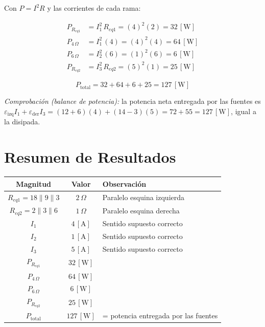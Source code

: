 \documentclass[12pt,letterpaper]{article}
\begin{document}
Con $P = I^2 R$ y las corrientes de cada rama:

\begin{align*}
    P_{R_{eq1}} &= I_1^2\,R_{eq1} = (4)^2 (2) = 32\,[\text{W}] \\
    P_{4\,\Omega} &= I_1^2\,(4) = (4)^2 (4) = 64\,[\text{W}] \\
    P_{6\,\Omega} &= I_2^2\,(6) = (1)^2 (6) = 6\,[\text{W}] \\
    P_{R_{eq2}} &= I_3^2\,R_{eq2} = (5)^2 (1) = 25\,[\text{W}]
\end{align*}

\[
    \boxed{P_{\text{total}} = 32 + 64 + 6 + 25 = 127\,[\text{W}]}
\]

\noindent\small\textit{Comprobaci\'on (balance de potencia):} la potencia neta entregada por las
fuentes es $\varepsilon_{\text{izq}}I_1 + \varepsilon_{\text{der}}I_3 = (12{+}6)(4) + (14{-}3)(5)
= 72 + 55 = 127\,[\text{W}]$, igual a la disipada. \checkmark
\normalsize

\section*{Resumen de Resultados}

\begin{center}
\begin{tabular}{|c|c|l|}
\hline
\textbf{Magnitud} & \textbf{Valor} & \textbf{Observaci\'on} \\
\hline
$R_{eq1} = 18\|9\|3$ & $2\,\Omega$ & Paralelo esquina izquierda \\
$R_{eq2} = 2\|3\|6$  & $1\,\Omega$ & Paralelo esquina derecha \\
\hline
$I_1$ & $4\,[\text{A}]$ & Sentido supuesto correcto \\
$I_2$ & $1\,[\text{A}]$ & Sentido supuesto correcto \\
$I_3$ & $5\,[\text{A}]$ & Sentido supuesto correcto \\
\hline
$P_{R_{eq1}}$ & $32\,[\text{W}]$ & \\
$P_{4\,\Omega}$ & $64\,[\text{W}]$ & \\
$P_{6\,\Omega}$ & $6\,[\text{W}]$ & \\
$P_{R_{eq2}}$ & $25\,[\text{W}]$ & \\
$P_{\text{total}}$ & $127\,[\text{W}]$ & = potencia entregada por las fuentes \\
\hline
\end{tabular}
\end{center}
\end{document}
